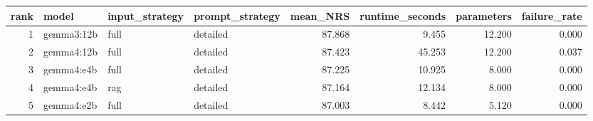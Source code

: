 \begin{tabular}{rlllrrrr}
\toprule
rank & model & input\_strategy & prompt\_strategy & mean\_NRS & runtime\_seconds & parameters & failure\_rate \\
\midrule
1 & gemma3:12b & full & detailed & 87.868 & 9.455 & 12.200 & 0.000 \\
2 & gemma4:12b & full & detailed & 87.423 & 45.253 & 12.200 & 0.037 \\
3 & gemma4:e4b & full & detailed & 87.225 & 10.925 & 8.000 & 0.000 \\
4 & gemma4:e4b & rag & detailed & 87.164 & 12.134 & 8.000 & 0.000 \\
5 & gemma4:e2b & full & detailed & 87.003 & 8.442 & 5.120 & 0.000 \\
\bottomrule
\end{tabular}
